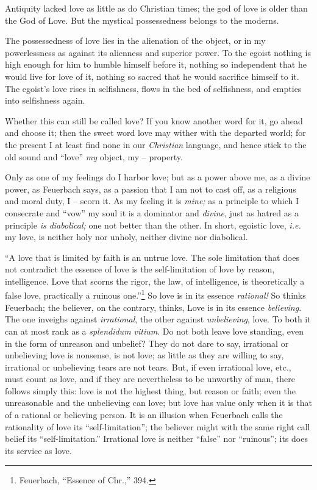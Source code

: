 \documentclass[12pt,a4paper]{book}
\begin{document}
Antiquity lacked love as little as do Christian times; the god of love is 
older than the God of Love. But the mystical possessedness belongs to the 
moderns.

The possessedness of love lies in the alienation of the object, or in my 
powerlessness as against its alienness and superior power. To the egoist 
nothing is high enough for him to humble himself before it, nothing so 
independent that he would live for love of it, nothing so sacred that he would 
sacrifice himself to it. The egoist's love rises in selfishness, flows in the 
bed of selfishness, and empties into selfishness again.

Whether this can still be called love? If you know another word for it, go 
ahead and choose it; then the sweet word love may wither with the departed 
world; for the present I at least find none in our \textit{Christian} 
language, and hence stick to the old sound and ``love'' \textit{my} object, 
my -- property.

Only as one of my feelings do I harbor love; but as a power above me, as a 
divine power, as Feuerbach says, as a passion that I am not to cast off, as a 
religious and moral duty, I -- scorn it. As my feeling it is \textit{mine;} as 
a principle to which I consecrate and ``vow'' my soul it is a dominator and 
\textit{divine}, just as hatred as a principle \textit{is diabolical;} one not 
better than the other. In short, egoistic love, \textit{i.e.} my love, is 
neither holy nor unholy, neither divine nor diabolical.

``A love that is limited by faith is an untrue love. The sole limitation that 
does not contradict the essence of love is the self-limitation of love by 
reason, intelligence. Love that scorns the rigor, the law, of intelligence, is 
theoretically a false love, practically a ruinous one.''\footnote{Feuerbach, 
``Essence of Chr.,'' 394.} So love is in its essence \textit{rational!} So 
thinks Feuerbach; the believer, on the contrary, thinks, Love is in its 
essence \textit{believing}. The one inveighs against \textit{irrational}, the 
other against \textit{unbelieving}, love. To both it can at most rank as a 
\textit{splendidum vitium}. Do not both leave love standing, even in the form 
of unreason and unbelief? They do not dare to say, irrational or unbelieving 
love is nonsense, is not love; as little as they are willing to say, 
irrational or unbelieving tears are not tears. But, if even irrational love, 
etc., must count as love, and if they are nevertheless to be unworthy of man, 
there follows simply this: love is not the highest thing, but reason or faith; 
even the unreasonable and the unbelieving can love; but love has value only 
when it is that of a rational or believing person. It is an illusion when 
Feuerbach calls the rationality of love its ``self-limitation''; the 
believer might with the same right call belief its ``self-limitation.'' 
Irrational love is neither ``false'' nor ``ruinous''; its does its service 
as love.
\end{document}
